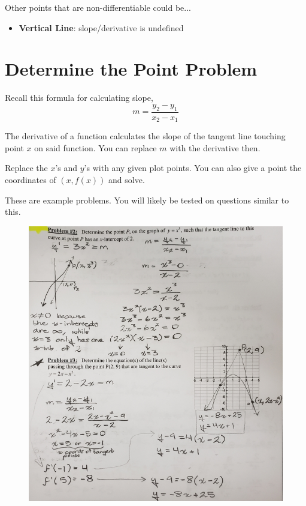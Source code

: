 \documentclass[a4paper,12pt]{article}
\begin{document}
Other points that are non-differentiable could be...
\begin{itemize}
    \item{\textbf{Vertical Line}: slope/derivative is undefined}
\end{itemize}

\pagebreak

\section{Determine the Point Problem}
Recall this formula for calculating slope,
$$m = \frac{y_2 - y_1}{x_2 - x_1}$$

The derivative of a function calculates the slope of the tangent line touching point $x$ on said function. You can replace $m$ with the derivative then.

Replace the $x$'s and $y$'s with any given plot points. You can also give a point the coordinates of $(x, f(x))$ and solve.

These are example problems. You will likely be tested on questions similar to this.

\begin{figure}[H]
    \centering
    \includegraphics[width=\textwidth]{point}
\end{figure}
\end{document}

